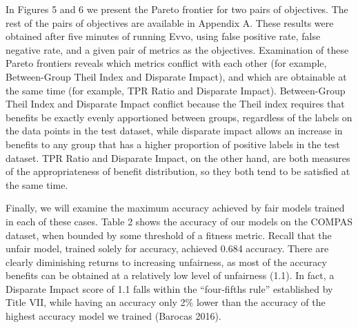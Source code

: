 \documentclass[twoside]{article}
\begin{document}
In Figures 5 and 6 we present the Pareto frontier for two pairs of objectives. The rest of the pairs of objectives are available in Appendix A. These results were obtained after five minutes of running Evvo, using false positive rate, false negative rate, and a given pair of metrics as the objectives. Examination of these Pareto frontiers reveals which metrics conflict with each other (for example, Between-Group Theil Index and Disparate Impact), and which are obtainable at the same time (for example, TPR Ratio and Disparate Impact). Between-Group Theil Index and Disparate Impact conflict because the Theil index requires that benefits be exactly evenly apportioned between groups, regardless of the labels on the data points in the test dataset, while disparate impact allows an increase in benefits to any group that has a higher proportion of positive labels in the test dataset. TPR Ratio and Disparate Impact, on the other hand, are both measures of the appropriateness of benefit distribution, so they both tend to be satisfied at the same time. 


Finally, we will examine the maximum accuracy achieved by fair models trained in each of these cases. Table 2 shows the accuracy of our models on the COMPAS dataset, when bounded by some threshold of a fitness metric. Recall that the unfair model, trained solely for accuracy, achieved 0.684 accuracy. There are clearly diminishing returns to increasing unfairness, as most of the accuracy benefits can be obtained at a relatively low level of unfairness (1.1). In fact, a Disparate Impact score of 1.1 falls within the “four-fifths rule” established by Title VII, while having an accuracy only 2\% lower than the accuracy of the highest accuracy model we trained (Barocas 2016).
\end{document}
